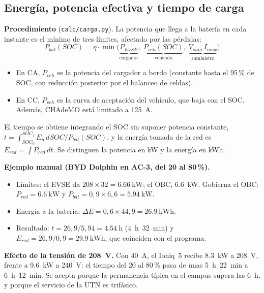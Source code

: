 
\subsection{Energía, potencia efectiva y tiempo de carga}
\label{sec:calc_carga}
\textbf{Procedimiento} (\texttt{calc/carga.py}). La potencia que llega a la batería en cada instante es el mínimo de tres límites, afectado por las pérdidas:
\begin{equation}
P_{bat}(SOC)=\eta\cdot\min\Big(\underbrace{P_{EVSE}}_{\text{cargador}},\;\underbrace{P_{veh}(SOC)}_{\text{vehículo}},\;\underbrace{V_{sum}\,I_{max}}_{\text{suministro}}\Big)
\end{equation}
\begin{itemize}
\item En CA, $P_{veh}$ es la potencia del cargador a bordo (constante hasta el 95\,\% de SOC, con reducción posterior por el balanceo de celdas).
\item En CC, $P_{veh}$ es la curva de aceptación del vehículo, que baja con el SOC. Además, CHAdeMO está limitado a 125~A.
\end{itemize}
El tiempo se obtiene integrando el SOC sin suponer potencia constante, $t=\int_{SOC_0}^{SOC_1}E_u\,dSOC/P_{bat}(SOC)$, y la energía tomada de la red es $E_{red}=\int P_{red}\,dt$. Se distinguen la potencia en kW y la energía en kWh.

\textbf{Ejemplo manual (BYD Dolphin en AC-3, del 20 al 80\,\%).}
\begin{itemize}
\item Límites: el EVSE da $208\times 32=\SI{6.66}{\kilo\watt}$; el OBC, \SI{6.6}{\kilo\watt}. Gobierna el OBC: $P_{red}=\SI{6.6}{\kilo\watt}$ y $P_{bat}=0{,}9\times 6{,}6=\SI{5.94}{\kilo\watt}$.
\item Energía a la batería: $\Delta E=0{,}6\times 44{,}9=\SI{26.9}{\kilo\watt\hour}$.
\item Resultado: $t=26{,}9/5{,}94=\SI{4.54}{\hour}$ (4~h~32~min) y $E_{red}=26{,}9/0{,}9=\SI{29.9}{\kilo\watt\hour}$, que coinciden con el programa.
\end{itemize}
\textbf{Efecto de la tensión de 208~V.} Con 40~A, el Ioniq~5 recibe \SI{8.3}{\kilo\watt} a 208~V, frente a \SI{9.6}{\kilo\watt} a 240~V: el tiempo del 20 al 80\,\% pasa de unas 5~h~22~min a 6~h~12~min. Se acepta porque la permanencia típica en el campus supera las 6~h, y porque el servicio de la UTN es trifásico.

